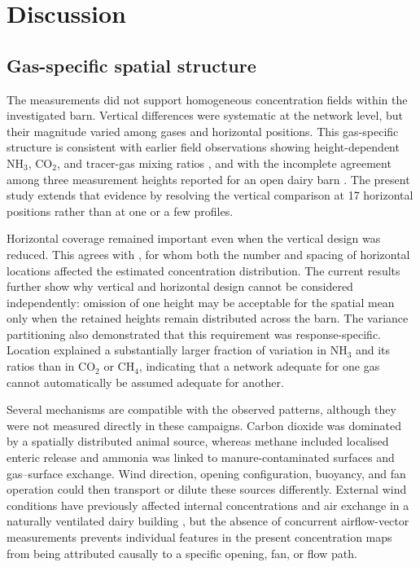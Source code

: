 \documentclass[12pt,a4paper]{article}
\begin{document}
\section{Discussion}

\subsection{Gas-specific spatial structure}

The measurements did not support homogeneous concentration fields within the
investigated barn. Vertical differences were systematic at the network level,
but their magnitude varied among gases and horizontal positions. This
gas-specific structure is consistent with earlier field observations showing
height-dependent \(\mathrm{NH_3}\), \(\mathrm{CO_2}\), and tracer-gas
mixing ratios \citep{Mendes2015}, and with the incomplete agreement among
three measurement heights reported for an open dairy barn
\citep{Durso2024}. The present study extends that evidence by resolving the
vertical comparison at 17 horizontal positions rather than at one or a few
profiles.

Horizontal coverage remained important even when the vertical design was
reduced. This agrees with \citet{Durso2022}, for whom both the number and
spacing of horizontal locations affected the estimated concentration
distribution. The current results further show why vertical and horizontal
design cannot be considered independently: omission of one height may be
acceptable for the spatial mean only when the retained heights remain
distributed across the barn. The variance partitioning also demonstrated that
this requirement was response-specific. Location explained a substantially
larger fraction of variation in \(\mathrm{NH_3}\) and its ratios than in
\(\mathrm{CO_2}\) or \(\mathrm{CH_4}\), indicating that a network adequate
for one gas cannot automatically be assumed adequate for another.

Several mechanisms are compatible with the observed patterns, although they
were not measured directly in these campaigns. Carbon dioxide was dominated
by a spatially distributed animal source, whereas methane included localised
enteric release and ammonia was linked to manure-contaminated surfaces and
gas--surface exchange. Wind direction, opening configuration, buoyancy, and
fan operation could then transport or dilute these sources differently.
External wind conditions have previously affected internal concentrations and
air exchange in a naturally ventilated dairy building \citep{Saha2013}, but
the absence of concurrent airflow-vector measurements prevents individual
features in the present concentration maps from being attributed causally to
a specific opening, fan, or flow path.
\end{document}
